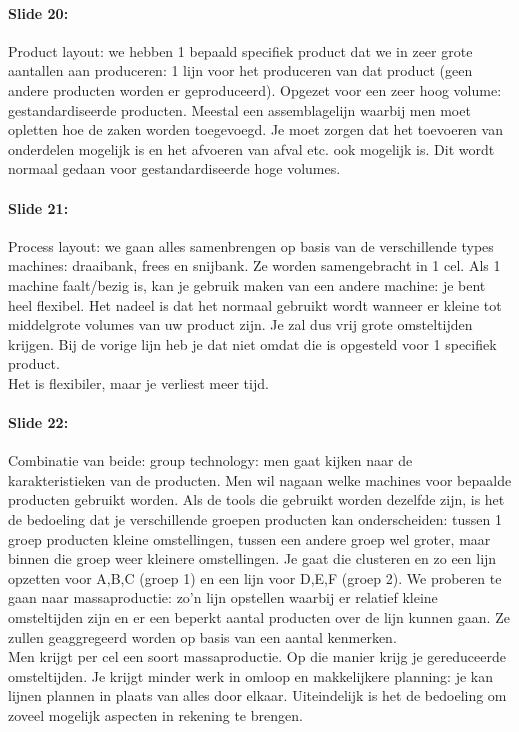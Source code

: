 \documentclass[10pt,a4paper]{report}
\begin{document}
\paragraph{Slide 20:} Product layout: we hebben 1 bepaald specifiek product dat we in zeer grote aantallen aan produceren: 1 lijn voor het produceren van dat product (geen andere producten worden er geproduceerd). Opgezet voor een zeer hoog volume: gestandardiseerde producten. Meestal een assemblagelijn waarbij men moet opletten hoe de zaken worden toegevoegd. Je moet zorgen dat het toevoeren van onderdelen mogelijk is en het afvoeren van afval etc. ook mogelijk is. Dit wordt normaal gedaan voor gestandardiseerde hoge volumes. 

\paragraph{Slide 21:} Process layout: we gaan alles samenbrengen op basis van de verschillende types machines: draaibank, frees en snijbank. Ze worden samengebracht in 1 cel. Als 1 machine faalt/bezig is, kan je gebruik maken van een andere machine: je bent heel flexibel. Het nadeel is dat het normaal gebruikt wordt wanneer er kleine tot middelgrote volumes van uw product zijn. Je zal dus vrij grote omsteltijden krijgen. Bij de vorige lijn heb je dat niet omdat die is opgesteld voor 1 specifiek product.\\
Het is flexibiler, maar je verliest meer tijd.

\paragraph{Slide 22:} Combinatie van beide: group technology: men gaat kijken naar de karakteristieken van de producten. Men wil nagaan welke machines voor bepaalde producten gebruikt worden. Als de tools die gebruikt worden dezelfde zijn, is het de bedoeling dat je verschillende groepen producten kan onderscheiden: tussen 1 groep producten kleine omstellingen, tussen een andere groep wel groter, maar binnen die groep weer kleinere omstellingen. Je gaat die clusteren en zo een lijn opzetten voor A,B,C (groep 1) en een lijn voor D,E,F (groep 2). We proberen te gaan naar massaproductie: zo'n lijn opstellen waarbij er relatief kleine omsteltijden zijn en er een beperkt aantal producten over de lijn kunnen gaan. Ze zullen geaggregeerd worden op basis van een aantal kenmerken.\\
Men krijgt per cel een soort massaproductie. Op die manier krijg je gereduceerde omsteltijden. Je krijgt minder werk in omloop en makkelijkere planning: je kan lijnen plannen in plaats van alles door elkaar.
Uiteindelijk is het de bedoeling om zoveel mogelijk aspecten in rekening te brengen.
\end{document}
